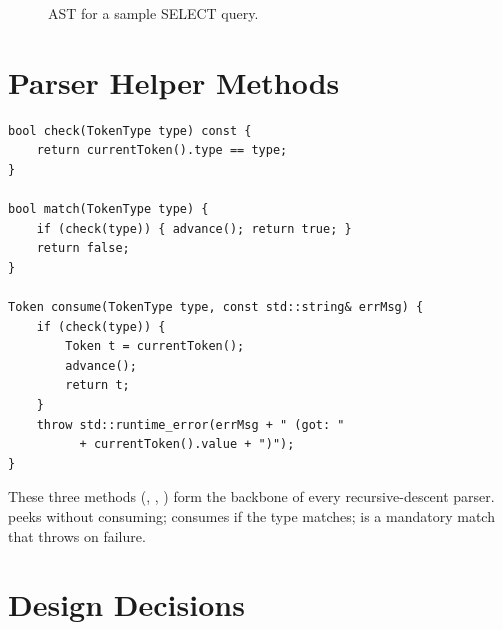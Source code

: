 \begin{figure}[H]
\centering
{}
\caption{AST for a sample SELECT query.}
\label{fig:ast-example}
\end{figure}

\section{Parser Helper Methods}

\begin{lstlisting}[style=cpp, caption={Core parser helper methods.}]
bool check(TokenType type) const {
    return currentToken().type == type;
}

bool match(TokenType type) {
    if (check(type)) { advance(); return true; }
    return false;
}

Token consume(TokenType type, const std::string& errMsg) {
    if (check(type)) {
        Token t = currentToken();
        advance();
        return t;
    }
    throw std::runtime_error(errMsg + " (got: "
          + currentToken().value + ")");
}
\end{lstlisting}

These three methods (, , ) form the backbone of every recursive-descent parser.   peeks without consuming;  consumes if the type matches;  is a mandatory match that throws on failure.

\section{Design Decisions}

